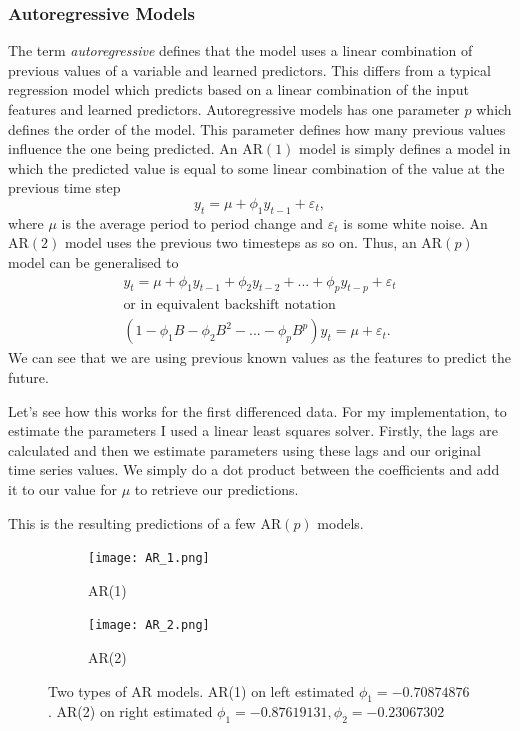\documentclass{article}
\begin{document}
  \subsubsection{Autoregressive Models}
    The term \emph{autoregressive} defines that the model uses a linear combination of previous values of a variable and learned predictors. This differs from a typical regression model which predicts based on a linear combination of the input features and learned predictors.
    Autoregressive models has one parameter $p$ which defines the order of the model. This parameter defines how many previous values influence the one being predicted. 
    An AR$(1)$ model is simply defines a model in which the predicted value is equal to some linear combination of the value at the previous time step
    \begin{equation*}
      y_t = \mu + \phi_1 y_{t-1} + \varepsilon_t,
    \end{equation*}
    where $\mu$ is the average period to period change and $\varepsilon_t$ is some white noise.
    An AR$(2)$ model uses the previous two timesteps as so on.
    Thus, an AR$(p)$ model can be generalised to
    \begin{gather*}
      y_t = \mu + \phi_1 y_{t-1} + \phi_2 y_{t-2} + ... + \phi_p y_{t-p} + \varepsilon_t\\
      \text{or in equivalent backshift notation}\\
      (1 - \phi_1B - \phi_2B^2 - ... - \phi_pB^p)y_t = \mu + \varepsilon_t.
    \end{gather*}
    We can see that we are using previous known values as the features to predict the future.

    Let's see how this works for the first differenced data. For my implementation, to estimate the parameters I used a linear least squares solver. Firstly, the lags are calculated and then we estimate parameters using these lags and our original time series values. We simply do a dot product between the coefficients and add it to our value for $\mu$ to retrieve our predictions. 
    
    This is the resulting predictions of a few AR$(p)$ models.

    \begin{figure}[H]
      \centering
      \captionsetup{justification=centering}
      \begin{subfigure}[b]{0.49\linewidth}
        \texttt{[image: AR\_1.png]}
        \caption{AR(1)}
      \end{subfigure}
      \begin{subfigure}[b]{0.49\linewidth}
        \texttt{[image: AR\_2.png]}
        \caption{AR(2)}
      \end{subfigure}
      \caption{Two types of AR models. AR(1) on left estimated $\phi_1 = -0.70874876$. AR(2) on right estimated $\phi_1 = -0.87619131, \phi_2 = -0.23067302$}
    \end{figure}
\end{document}
